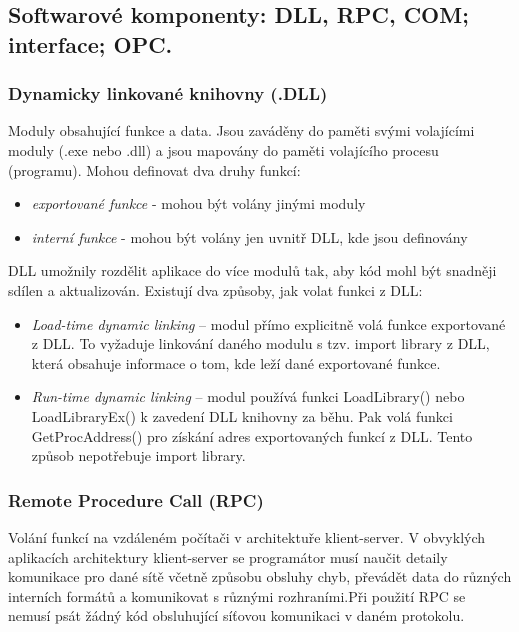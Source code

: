 \subsection{Softwarové komponenty: DLL, RPC, COM; interface; OPC.}
\subsubsection*{Dynamicky linkované knihovny (.DLL)}
Moduly obsahující funkce a data. Jsou zaváděny do paměti svými volajícími moduly (.exe nebo .dll) a jsou mapovány do paměti volajícího procesu (programu). Mohou definovat dva druhy funkcí:
\begin{itemize}
\item \textit{exportované funkce} - mohou být volány jinými moduly
\item \textit{interní funkce} - mohou být volány jen uvnitř DLL, kde jsou definovány
\end{itemize}
DLL umožnily rozdělit aplikace do více modulů tak, aby kód mohl být snadněji sdílen a aktualizován. Existují dva způsoby, jak volat funkci z DLL:
\begin{itemize}
\item \textit{Load-time dynamic linking} – modul přímo explicitně volá funkce exportované z DLL. To vyžaduje linkování daného modulu s tzv. import library z DLL, která obsahuje informace o tom, kde leží dané exportované funkce.
\item \textit{Run-time dynamic linking} – modul používá funkci LoadLibrary() nebo LoadLibraryEx() k zavedení DLL knihovny za běhu. Pak volá funkci GetProcAddress() pro získání adres exportovaných funkcí z DLL. Tento způsob nepotřebuje import library.
\end{itemize}

\subsubsection*{Remote Procedure Call (RPC)}
Volání funkcí na vzdáleném počítači v architektuře klient-server. V obvyklých aplikacích architektury klient-server se programátor musí naučit detaily komunikace pro dané sítě včetně způsobu obsluhy chyb, převádět data do různých interních formátů a komunikovat s různými rozhraními.Při použití RPC se nemusí psát žádný kód obsluhující síťovou komunikaci v daném protokolu.

